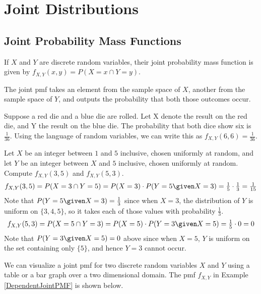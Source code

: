 \pagestyle{headings}
\chapter{Joint Distributions} \label{chp 5}
\thispagestyle{fancy}

\section{Joint Probability Mass Functions}

\begin{defn}\label{JointPMF}
If $X$ and $Y$ are discrete random variables, their joint probability mass function is given by $f_{X,Y}(x,y) = P(X = x  \cap Y = y)$.
\end{defn}
\par
The joint pmf takes an element from the sample space of $X$, another from the sample space of $Y$, and outputs the probability that both those outcomes occur.
\begin{examp}
Suppose a red die and a blue die are rolled. Let X denote the result on the red die, and Y the result on the blue die. The probability that both dice show six is $\frac{1}{36}$. Using the language of random variables, we can write this as $f_{X,Y}(6,6) = \frac{1}{36}$.
\end{examp}
\begin{examp}\label{DependentJointPMF}
Let $X$ be an integer between $1$ and $5$ inclusive, chosen uniformly at random, and let $Y$ be an integer between $X$ and $5$ inclusive, chosen uniformly at random. Compute $f_{X,Y}(3,5)$ and $f_{X,Y}(5,3)$.
$$f_{X,Y}(3,5) = P(X = 3 \cap  Y = 5) = P(X = 3)\cdot P(Y = 5 \given X = 3) = \textstyle\frac{1}{5}\cdot\frac{1}{3} = \frac{1}{15}$$
\noindent Note that $P(Y = 5 \given X = 3) = \frac{1}{3}$ since when $X = 3$, the distribution of $Y$ is uniform on $\{3,4,5\}$, so it takes each of those values with probability $\frac{1}{3}$.
$$f_{X,Y}(5,3) = P(X = 5 \cap  Y = 3) = P(X = 5)\cdot P(Y = 3 \given X = 5) = \textstyle\frac{1}{5}\cdot 0 = 0$$
Note that $P(Y = 3 \given X = 5) = 0$ above since when $X = 5$, $Y$ is uniform on the set containing only $\{5\}$, and hence $Y=3$ cannot occur.
\end{examp}
\par
We can visualize a joint pmf for two discrete random variables $X$ and $Y$ using a table or a bar graph over a two dimensional domain. The pmf $f_{X,Y}$ in Example \ref{DependentJointPMF} is shown below.
